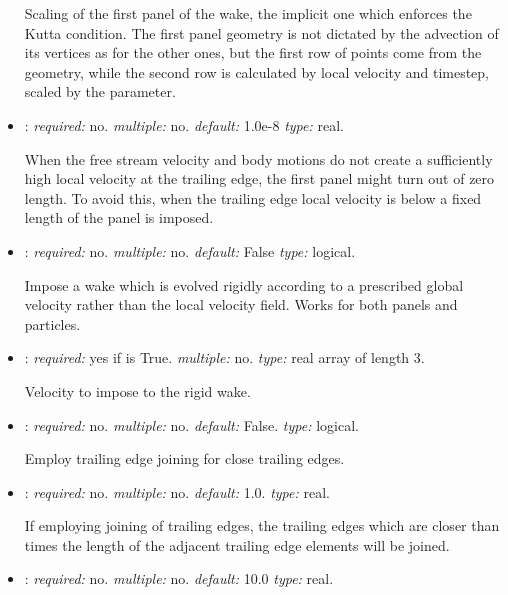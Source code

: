 \begin{itemize}
Scaling of the first panel of the wake, the implicit one which enforces the Kutta 
condition. The first panel geometry is not dictated by the advection of its 
vertices as for the other ones, but the first row of points come from the geometry, 
while the second row is calculated by local velocity and timestep, 
scaled by the  parameter.


\item {}: \textit{required:} no. \textit{multiple:} no. 
\textit{default:} 1.0e-8 \textit{type:} real.

When the free stream velocity and body motions do not create a sufficiently high 
local velocity at the trailing edge, the first panel might turn out of zero length. 
To avoid this, when the trailing edge local velocity is below 
 a fixed length of the panel is imposed.

\item {}: \textit{required:} no. \textit{multiple:} no. 
\textit{default:} False \textit{type:} logical.

Impose a wake which is evolved rigidly according to a prescribed global 
velocity rather than the local velocity field. Works for both panels and 
particles.

\item {}: \textit{required:} yes if  is True. 
\textit{multiple:} no. \textit{type:} real array of length 3.

Velocity to impose to the rigid wake.

\item {}: \textit{required:} no. \textit{multiple:} no. 
\textit{default:} False. \textit{type:} logical.

Employ trailing edge joining for close trailing edges.

\item {}: \textit{required:} no. \textit{multiple:} no. 
\textit{default:} 1.0. \textit{type:} real.

If employing joining of trailing edges, the trailing edges which are closer than 
 times the length of the adjacent trailing edge elements 
will be joined. 

\item {}: \textit{required:} no. \textit{multiple:} no. 
\textit{default:} 10.0 \textit{type:} real.


\end{itemize}
